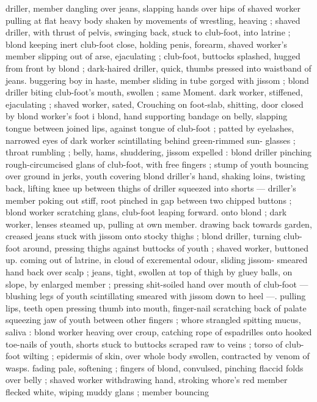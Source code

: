driller, member dangling over jeans, slapping hands over hips of
shaved worker pulling at flat heavy body shaken by movements of
wrestling, heaving ; shaved driller, with thrust of pelvis, swinging
back, stuck to club-foot, into latrine ; blond keeping inert club-foot
close, holding penis, forearm, shaved worker's member slipping out
of arse, ejaculating ; club-foot, buttocks splashed, hugged from front
by blond ; dark-haired driller, quick, thumbs pressed into waistband
of jeans. buggering boy in haste, member sliding in tube gorged with
jissom ; blond driller biting club-foot's mouth, swollen ; same
Moment. dark worker, stiffened, ejaculating ; shaved worker, sated,
Crouching on foot-slab, shitting, door closed by blond worker's foot
i blond, hand supporting bandage on belly, slapping tongue between
joined lips, against tongue of club-foot ; patted by eyelashes,
narrowed eyes of dark worker scintillating behind green-rimmed sun-
glasses ; throat rumbling ; belly, hams, shuddering, jissom expelled :
blond driller pinching rough-circumcised glans of club-foot, with free
fingers ; stump of youth bouncing over ground in jerks, youth
covering blond driller’s hand, shaking loins, twisting back, lifting
knee up between thighs of driller squeezed into shorts --- driller's
member poking out stiff, root pinched in gap between two chipped
buttons ; blond worker scratching glans, club-foot leaping forward.
onto blond ; dark worker, lenses steamed up, pulling at own member.
drawing back towards garden, creased jeans stuck with jissom onto
stocky thighs ; blond driller, turning club-foot around, pressing
thighs against buttocks of youth ; shaved worker, buttoned up.
coming out of latrine, in cloud of excremental odour, sliding jissom-
smeared hand back over scalp ; jeans, tight, swollen at top of thigh
by gluey balls, on slope, by enlarged member ; pressing shit-soiled
hand over mouth of club-foot --- blushing legs of youth scintillating
smeared with jissom down to heel ---. pulling lips, teeth open
pressing thumb into mouth, finger-nail scratching back of palate
squeezing jaw of youth between other fingers ; whore strangled
spitting mucus, saliva : blond worker heaving over croup, catching
rope of espadrilles onto hooked toe-nails of youth, shorts stuck to
buttocks scraped raw to veins ; torso of club-foot wilting ; epidermis
of skin, over whole body swollen, contracted by venom of wasps.
fading pale, softening ; fingers of blond, convulsed, pinching flaccid
folds over belly ; shaved worker withdrawing hand, stroking whore's
red member flecked white, wiping muddy glans ; member bouncing
